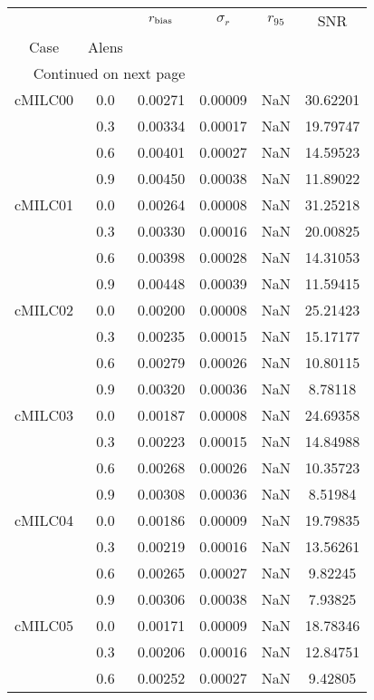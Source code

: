 \begin{longtable}{cccccc}
\toprule
        &     &  $r_{\rm bias}$  &  $\sigma_r$ &  $r_{95}$ &      SNR \\
Case & Alens &                  &             &           &          \\
\midrule
\endhead
\midrule
\multicolumn{3}{r}{{Continued on next page}} \\
\midrule
\endfoot

\bottomrule
\endlastfoot
cMILC00 & 0.0 & 0.00271 & 0.00009 & NaN & 30.62201 \\
        & 0.3 & 0.00334 & 0.00017 & NaN & 19.79747 \\
        & 0.6 & 0.00401 & 0.00027 & NaN & 14.59523 \\
        & 0.9 & 0.00450 & 0.00038 & NaN & 11.89022 \\
cMILC01 & 0.0 & 0.00264 & 0.00008 & NaN & 31.25218 \\
        & 0.3 & 0.00330 & 0.00016 & NaN & 20.00825 \\
        & 0.6 & 0.00398 & 0.00028 & NaN & 14.31053 \\
        & 0.9 & 0.00448 & 0.00039 & NaN & 11.59415 \\
cMILC02 & 0.0 & 0.00200 & 0.00008 & NaN & 25.21423 \\
        & 0.3 & 0.00235 & 0.00015 & NaN & 15.17177 \\
        & 0.6 & 0.00279 & 0.00026 & NaN & 10.80115 \\
        & 0.9 & 0.00320 & 0.00036 & NaN & 8.78118 \\
cMILC03 & 0.0 & 0.00187 & 0.00008 & NaN & 24.69358 \\
        & 0.3 & 0.00223 & 0.00015 & NaN & 14.84988 \\
        & 0.6 & 0.00268 & 0.00026 & NaN & 10.35723 \\
        & 0.9 & 0.00308 & 0.00036 & NaN & 8.51984 \\
cMILC04 & 0.0 & 0.00186 & 0.00009 & NaN & 19.79835 \\
        & 0.3 & 0.00219 & 0.00016 & NaN & 13.56261 \\
        & 0.6 & 0.00265 & 0.00027 & NaN & 9.82245 \\
        & 0.9 & 0.00306 & 0.00038 & NaN & 7.93825 \\
cMILC05 & 0.0 & 0.00171 & 0.00009 & NaN & 18.78346 \\
        & 0.3 & 0.00206 & 0.00016 & NaN & 12.84751 \\
        & 0.6 & 0.00252 & 0.00027 & NaN & 9.42805 \\

\end{longtable}
